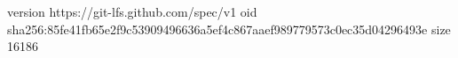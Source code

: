 version https://git-lfs.github.com/spec/v1
oid sha256:85fe41fb65e2f9c53909496636a5ef4c867aaef989779573c0ec35d04296493e
size 16186
